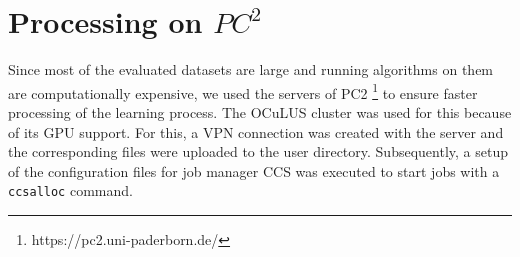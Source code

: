 \section{Processing on $PC^2$}
\label{sec:processing_on_pc2}
%
Since most of the evaluated datasets are large and running algorithms on them are computationally expensive, we used the servers of \ac{PC2} \footnote{https://pc2.uni-paderborn.de/} to ensure faster processing of the learning process.
The \ac{OCuLUS} cluster was used for this because of its GPU support.
For this, a \ac{VPN} connection was created with the server and the corresponding files were uploaded to the user directory.
Subsequently, a setup of the configuration files for job manager CCS was executed to start jobs with a \texttt{ccsalloc} command.
